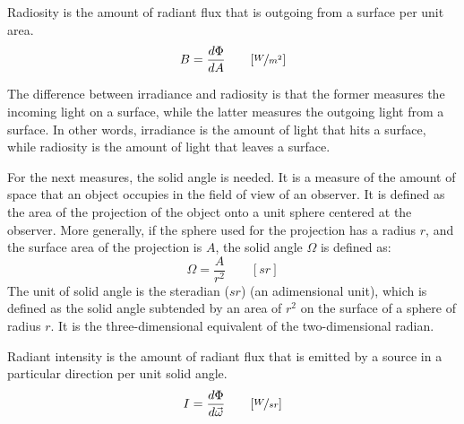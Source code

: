 \begin{definicion}[Radiosity]
Radiosity is the amount of radiant flux that is outgoing from a surface per unit area.
\begin{equation*}
    B = \frac{d\Phi}{dA} \qquad [\nicefrac{W}{m^2}]
\end{equation*}
\end{definicion}

\begin{observacion}
    The difference between irradiance and radiosity is that the former measures the incoming light on a surface, while the latter measures the outgoing light from a surface. In other words, irradiance is the amount of light that hits a surface, while radiosity is the amount of light that leaves a surface.
\end{observacion}

For the next measures, the solid angle is needed. It is a measure of the amount of space that an object occupies in the field of view of an observer. It is defined as the area of the projection of the object onto a unit sphere centered at the observer. More generally, if the sphere used for the projection has a radius $r$, and the surface area of the projection is $A$, the solid angle $\Omega$ is defined as:
\begin{equation*}
    \Omega = \frac{A}{r^2} \qquad [sr]
\end{equation*}
The unit of solid angle is the steradian ($sr$) (an adimensional unit), which is defined as the solid angle subtended by an area of $r^2$ on the surface of a sphere of radius $r$. It is the three-dimensional equivalent of the two-dimensional radian.

\begin{definicion}
Radiant intensity is the amount of radiant flux that is emitted by a source in a particular direction per unit solid angle.
\begin{equation*}
    I = \frac{d\Phi}{d\vec{\omega}} \qquad [\nicefrac{W}{sr}]
\end{equation*}
\end{definicion}

